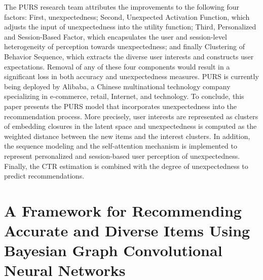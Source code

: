 The PURS research team attributes the improvements to the following four factors: First, unexpectedness; Second, Unexpected Activation Function, which adjusts the input of unexpectedness into the utility function; Third, Personalized and Session-Based Factor, which encapsulates the user and session-level heterogeneity of perception towards unexpectedness; and finally Clustering of Behavior Sequence, which extracts the diverse user interests and constructs user expectations. Removal of any of these four components would result in a significant loss in both accuracy and unexpectedness measures. PURS is currently being deployed by Alibaba, a Chinese multinational technology company specializing in e-commerce, retail, Internet, and technology.
To conclude, this paper presents the PURS model that incorporates unexpectedness into the recommendation process. More precisely, user interests are represented as clusters of embedding closures in the latent space and unexpectedness is computed as the weighted distance between the new items and the interest clusters. In addition, the sequence modeling and the self-attention mechanism is implemented to represent personalized and session-based user perception of unexpectedness. Finally, the CTR estimation is combined with the degree of unexpectedness to predict recommendations. 

\section{A Framework for Recommending Accurate and Diverse Items  Using Bayesian Graph Convolutional Neural Networks}

